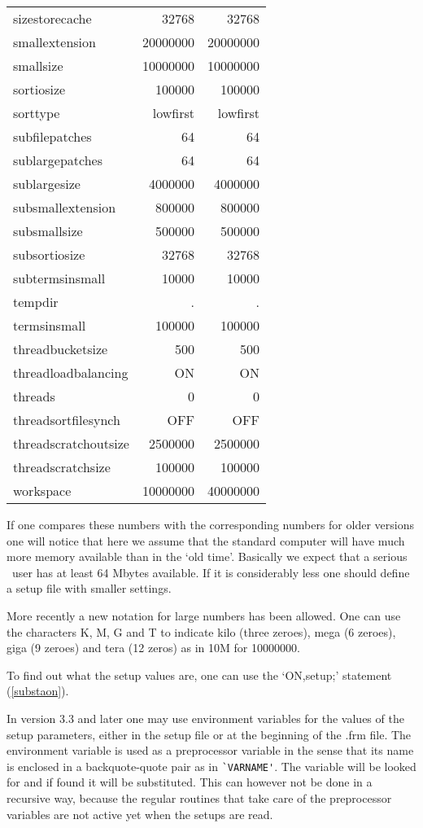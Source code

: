 \begin{center}
\begin{tabular}{lrr}
sizestorecache &        32768         & 32768 \\
smallextension &        20000000      & 20000000 \\
smallsize &             10000000      & 10000000 \\
sortiosize &            100000        & 100000 \\
sorttype &              lowfirst      & lowfirst \\
subfilepatches &        64            & 64 \\
sublargepatches &       64            & 64 \\
sublargesize &          4000000       & 4000000 \\
subsmallextension &     800000        & 800000 \\
subsmallsize &          500000        & 500000 \\
subsortiosize &         32768         & 32768 \\
subtermsinsmall &       10000         & 10000 \\
tempdir &               .             & . \\
termsinsmall &          100000        & 100000 \\
threadbucketsize &      500           & 500 \\
threadloadbalancing &   ON            & ON \\
threads &               0             & 0 \\
threadsortfilesynch &   OFF           & OFF \\
threadscratchoutsize &  2500000       & 2500000 \\
threadscratchsize &     100000        & 100000 \\
workspace &             10000000      & 40000000
\end{tabular}
\end{center}
If one compares these numbers with the corresponding numbers for older 
versions one will notice that here we assume that the standard computer 
will have much more memory available than in the `old time'. Basically we 
expect that a serious \FORM\ user has at least 64 Mbytes available. If it is 
considerably less one should define a setup file with smaller settings.

More recently a new notation for large numbers has been allowed. One can 
use the characters K, M, G and T to indicate kilo (three zeroes), mega (6 
zeroes), giga (9 zeroes) and tera (12 zeros) as in 10M for 10000000.

To find out what the setup values are, one can use the `ON,setup;' 
statement (\ref{substaon}).

In version 3.3 and later one may use environment 
variables for the values of the setup parameters, either in the setup file 
or at the beginning of the .frm file. The environment variable is used as a 
preprocessor variable in the sense that its name is enclosed in a 
backquote-quote pair as in \verb:`VARNAME':. The variable will be looked 
for and if found it will be substituted. This can however not be done in a 
recursive way, because the regular routines that take care of the 
preprocessor variables are not active yet when the setups are read.
